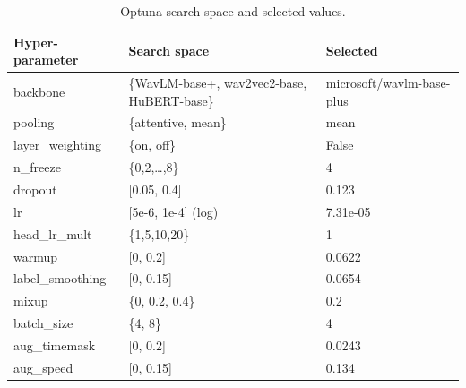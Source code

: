 \begin{table}[t]
\centering
\caption{Optuna search space and selected values.}
\label{tab:hparams}
\begin{tabular}{lll}
\toprule
Hyper-parameter & Search space & Selected \\
\midrule
backbone & \{WavLM-base+, wav2vec2-base, HuBERT-base\} & microsoft/wavlm-base-plus \\
pooling & \{attentive, mean\} & mean \\
layer\_weighting & \{on, off\} & False \\
n\_freeze & \{0,2,\dots,8\} & 4 \\
dropout & [0.05, 0.4] & 0.123 \\
lr & [5e-6, 1e-4] (log) & 7.31e-05 \\
head\_lr\_mult & \{1,5,10,20\} & 1 \\
warmup & [0, 0.2] & 0.0622 \\
label\_smoothing & [0, 0.15] & 0.0654 \\
mixup & \{0, 0.2, 0.4\} & 0.2 \\
batch\_size & \{4, 8\} & 4 \\
aug\_timemask & [0, 0.2] & 0.0243 \\
aug\_speed & [0, 0.15] & 0.134 \\
\bottomrule
\end{tabular}
\end{table}